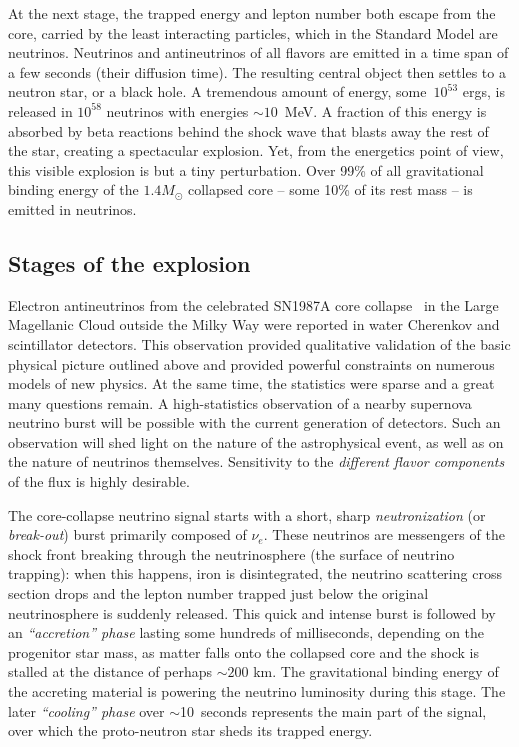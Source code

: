 At the next stage, the trapped energy and lepton number both escape from the core, carried by the least interacting particles, which in the Standard Model are neutrinos.  Neutrinos and antineutrinos of all flavors are emitted in a time span of a few seconds (their diffusion time). The resulting central object then settles to a neutron star, or a black hole. A tremendous amount of energy, some~$10^{53}$ ergs, is released in $10^{58}$ neutrinos with energies $\sim 10$~MeV. A fraction of this energy is absorbed by beta reactions behind the shock wave that blasts away the rest of the star, creating a spectacular explosion.
Yet, from the energetics point of view, this visible explosion is but a tiny perturbation. Over 99\% of all gravitational binding energy of the $1.4 M_{\odot}$ collapsed core -- some 10\% of its rest mass -- is emitted in neutrinos. 

\subsection{Stages of the explosion}

Electron antineutrinos from the celebrated SN1987A core
collapse~\cite{Bionta:1987qt,Hirata:1987hu} in the Large Magellanic
Cloud outside the Milky Way were reported in water Cherenkov and
scintillator detectors. This observation provided qualitative validation of the basic physical picture outlined above and provided powerful constraints on numerous models of new physics. At the same time, the
statistics 
were sparse 
and a great many questions remain.  A high-statistics observation of a
nearby supernova neutrino burst will be possible with the current
generation of detectors. Such an observation will shed light
on 
the nature of the astrophysical event, as well as on the nature of
neutrinos themselves.  Sensitivity to the \textit{different flavor components}
of the flux is highly desirable.

The core-collapse neutrino signal starts with a short, sharp
\emph{neutronization} (or \emph{break-out}) burst primarily composed of
$\nu_e$. These neutrinos are messengers of the shock front breaking through the neutrinosphere (the surface of neutrino trapping): when this happens, iron is disintegrated, the neutrino scattering cross section drops and the lepton number trapped just below the original neutrinosphere is suddenly released. This quick and intense burst is followed by an
\emph{``accretion'' phase} lasting some hundreds of milliseconds, depending on the progenitor star mass, as matter falls onto the collapsed core and the shock is stalled at the distance of perhaps $\sim 200$ km. The gravitational binding energy of the accreting material is powering the neutrino luminosity during this stage. The later
\emph{``cooling'' phase} over $\sim$10~seconds represents the main part of
the signal, over which the proto-neutron star sheds its trapped energy.  

